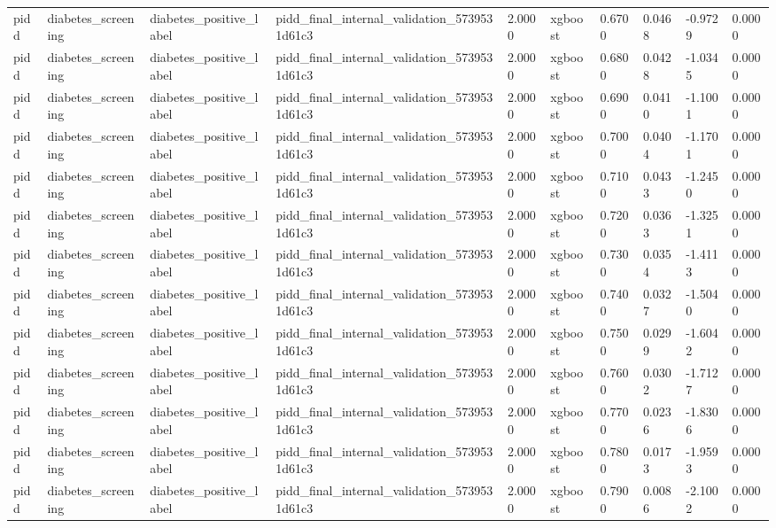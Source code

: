 \begin{tabular}{llllllllll}
pidd & diabetes\_screening & diabetes\_positive\_label & pidd\_final\_internal\_validation\_5739531d61c3 & 2.0000 & xgboost & 0.6700 & 0.0468 & -0.9729 & 0.0000 \\
pidd & diabetes\_screening & diabetes\_positive\_label & pidd\_final\_internal\_validation\_5739531d61c3 & 2.0000 & xgboost & 0.6800 & 0.0428 & -1.0345 & 0.0000 \\
pidd & diabetes\_screening & diabetes\_positive\_label & pidd\_final\_internal\_validation\_5739531d61c3 & 2.0000 & xgboost & 0.6900 & 0.0410 & -1.1001 & 0.0000 \\
pidd & diabetes\_screening & diabetes\_positive\_label & pidd\_final\_internal\_validation\_5739531d61c3 & 2.0000 & xgboost & 0.7000 & 0.0404 & -1.1701 & 0.0000 \\
pidd & diabetes\_screening & diabetes\_positive\_label & pidd\_final\_internal\_validation\_5739531d61c3 & 2.0000 & xgboost & 0.7100 & 0.0433 & -1.2450 & 0.0000 \\
pidd & diabetes\_screening & diabetes\_positive\_label & pidd\_final\_internal\_validation\_5739531d61c3 & 2.0000 & xgboost & 0.7200 & 0.0363 & -1.3251 & 0.0000 \\
pidd & diabetes\_screening & diabetes\_positive\_label & pidd\_final\_internal\_validation\_5739531d61c3 & 2.0000 & xgboost & 0.7300 & 0.0354 & -1.4113 & 0.0000 \\
pidd & diabetes\_screening & diabetes\_positive\_label & pidd\_final\_internal\_validation\_5739531d61c3 & 2.0000 & xgboost & 0.7400 & 0.0327 & -1.5040 & 0.0000 \\
pidd & diabetes\_screening & diabetes\_positive\_label & pidd\_final\_internal\_validation\_5739531d61c3 & 2.0000 & xgboost & 0.7500 & 0.0299 & -1.6042 & 0.0000 \\
pidd & diabetes\_screening & diabetes\_positive\_label & pidd\_final\_internal\_validation\_5739531d61c3 & 2.0000 & xgboost & 0.7600 & 0.0302 & -1.7127 & 0.0000 \\
pidd & diabetes\_screening & diabetes\_positive\_label & pidd\_final\_internal\_validation\_5739531d61c3 & 2.0000 & xgboost & 0.7700 & 0.0236 & -1.8306 & 0.0000 \\
pidd & diabetes\_screening & diabetes\_positive\_label & pidd\_final\_internal\_validation\_5739531d61c3 & 2.0000 & xgboost & 0.7800 & 0.0173 & -1.9593 & 0.0000 \\
pidd & diabetes\_screening & diabetes\_positive\_label & pidd\_final\_internal\_validation\_5739531d61c3 & 2.0000 & xgboost & 0.7900 & 0.0086 & -2.1002 & 0.0000 \\

\end{tabular}
